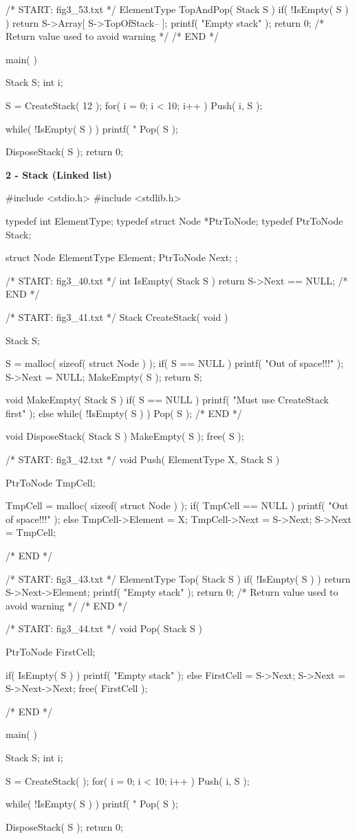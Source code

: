 \documentclass[12pt, a4paper]{article}
\begin{document}
\begin{code}
/* START: fig3_53.txt */
ElementType TopAndPop( Stack S )
{
    if( !IsEmpty( S ) )
        return S->Array[ S->TopOfStack-- ];
    printf( "Empty stack" );
    return 0;  /* Return value used to avoid warning */
}
/* END */

main( )
{
    Stack S;
    int i;

    S = CreateStack( 12 );
    for( i = 0; i < 10; i++ )
        Push( i, S );

    while( !IsEmpty( S ) )
    {
        printf( "%
        Pop( S );
    }

    DisposeStack( S );
    return 0;
}
\end{code}
\pagebreak

\huge\textbf{2 - Stack (Linked list)}
\begin{code}
#include <stdio.h>
#include <stdlib.h>

typedef int ElementType;
typedef struct Node *PtrToNode;
typedef PtrToNode Stack;

struct Node
{
    ElementType Element;
    PtrToNode   Next;
};

/* START: fig3_40.txt */
int IsEmpty( Stack S )
{
    return S->Next == NULL;
}
/* END */

/* START: fig3_41.txt */
Stack CreateStack( void )
{
    Stack S;

    S = malloc( sizeof( struct Node ) );
    if( S == NULL )
        printf( "Out of space!!!" );
    S->Next = NULL;
    MakeEmpty( S );
    return S;
}

void MakeEmpty( Stack S )
{
    if( S == NULL )
        printf( "Must use CreateStack first" );
    else
        while( !IsEmpty( S ) )
            Pop( S );
}
/* END */

void DisposeStack( Stack S )
{
    MakeEmpty( S );
    free( S );
}

/* START: fig3_42.txt */
void Push( ElementType X, Stack S )
{
    PtrToNode TmpCell;

    TmpCell = malloc( sizeof( struct Node ) );
    if( TmpCell == NULL )
        printf( "Out of space!!!" );
    else
    {
        TmpCell->Element = X;
        TmpCell->Next = S->Next;
        S->Next = TmpCell;
    }
}
/* END */

/* START: fig3_43.txt */
ElementType Top( Stack S )
{
    if( !IsEmpty( S ) )
        return S->Next->Element;
    printf( "Empty stack" );
    return 0;  /* Return value used to avoid warning */
}
/* END */

/* START: fig3_44.txt */
void Pop( Stack S )
{
    PtrToNode FirstCell;

    if( IsEmpty( S ) )
        printf( "Empty stack" );
    else
    {
        FirstCell = S->Next;
        S->Next = S->Next->Next;
        free( FirstCell );
    }
}
/* END */

main( )
{
    Stack S;
    int i;

    S = CreateStack( );
    for( i = 0; i < 10; i++ )
        Push( i, S );

    while( !IsEmpty( S ) )
    {
        printf( "%
        Pop( S );
    }

    DisposeStack( S );
    return 0;
}
\end{code}
\pagebreak
\end{document}
